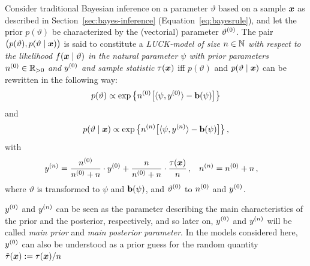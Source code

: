 \begin{definition}\label{070503-defin1}
Consider traditional Bayesian inference on a parameter $\vartheta$
based on a sample ${\bm x}$ as described in Section~\ref{sec:bayes-inference} (Equation~\eqref{eq:bayesrule}),
and let the prior $p(\vartheta)$ be characterized by the (vectorial) parameter
$\vartheta^{(0)}$. The pair $\big(p(\vartheta),
p(\vartheta\mid{\bm x})\big)$ is said to constitute a
\emph{LUCK-model of size $n\in \mathbb{N}$ with respect to the
likelihood $f({\bm x}\mid\vartheta)$ in the natural parameter $\psi$ with
prior parameters $n^{(0)} \in \mathbb{R}_{>0}$ and $y^{(0)}$ and sample
statistic $\tau({\bm x})$} iff $p(\vartheta)$ and $p(\vartheta\mid{\bm x})$
can be rewritten in the following way:%
\begin{equation}\label{070305-2}
p(\vartheta) \propto \exp\big\{ \nz \big[\langle \psi, \yz \rangle - \mbf{b}(\psi)\big]\big\} %
\end{equation}%
and %
\begin{equation}\label{070305-3}
p(\vartheta\mid\x) \propto \exp\big\{ \nn \big[\langle \psi, \yn \rangle - \mbf{b}(\psi)\big]\big\}\,,%
\end{equation}
with
\begin{align}\label{070305-4}
y^{(n)} &= \frac{n^{(0)}}{n^{(0)} + n} \cdot y^{(0)} + \frac{n}{n^{(0)} + n} \cdot \frac{\tau({\bm x})}{n}\,, &
n^{(n)} &= n^{(0)} + n\,,
\end{align}%
where $\vartheta$ is transformed to $\psi$ and $\mathbf{b}(\psi)$,
and $\vartheta^{(0)}$ to $n^{(0)}$ and $y^{(0)}$.
\end{definition}%
%
$y^{(0)}$ and $y^{(n)}$ can be seen as the parameter describing
the main characteristics of the prior and the posterior,
respectively, and so later on, $y^{(0)}$ and $y^{(n)}$ will be
called \emph{main prior} and \emph{main posterior parameter}.
In the models considered here, $y^{(0)}$ can also be understood as a prior
guess for the random quantity $\tilde{\tau}({\bm x}) := \tau({\bm x})/n$
